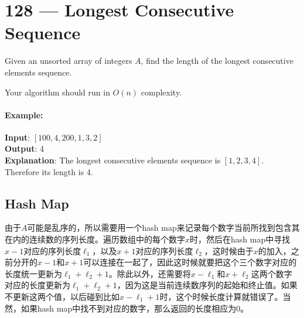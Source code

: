 \section{128 --- Longest Consecutive Sequence}
Given an unsorted array of integers $A$, find the length of the longest consecutive elements sequence.
\par
Your algorithm should run in $O(n)$ complexity.
\paragraph{Example:}
\begin{flushleft}
\textbf{Input}: $[100, 4, 200, 1, 3, 2]$
\\
\textbf{Output}: 4
\\
\textbf{Explanation}: The longest consecutive elements sequence is $[1, 2, 3, 4]$. Therefore its length is 4.
\end{flushleft}

\subsection{Hash Map}
由于$A$可能是乱序的，所以需要用一个hash map来记录每个数字当前所找到包含其在内的连续数的序列长度。遍历数组中的每个数字$x$时，然后在hash map中寻找$x-1$对应的序列长度$\ell_1$，以及$x+1$对应的序列长度$\ell_2$，这时候由于$x$的加入，之前分开的$x-1$和$x+1$可以连接在一起了，因此这时候就要把这个三个数字对应的长度统一更新为$\ell_1+\ell_2+1$。除此以外，还需要将$x - \ell_1$和$x+\ell_2$这两个数字对应的长度更新为$\ell_1+\ell_2+1$，因为这是当前连续数序列的起始和终止值。如果不更新这两个值，以后碰到比如$x-\ell_1+1$时，这个时候长度计算就错误了。当然，如果hash map中找不到对应的数字，那么返回的长度相应为0。


